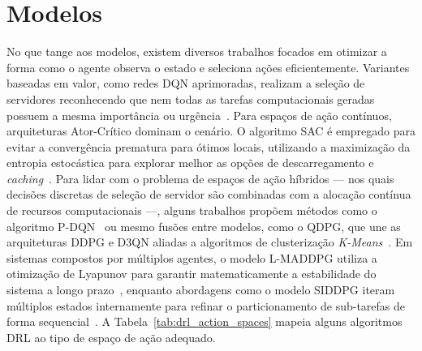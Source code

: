 \section*{Modelos}
No que tange aos modelos, existem diversos trabalhos focados em otimizar a forma como o agente observa o estado e seleciona ações eficientemente. Variantes baseadas em valor, como redes \gls{DQN} aprimoradas, realizam a seleção de servidores reconhecendo que nem todas as tarefas computacionais geradas possuem a mesma importância ou urgência~\cite{kumari2025}. Para espaços de ação contínuos, arquiteturas Ator-Crítico dominam o cenário. O algoritmo \gls{SAC} é empregado para evitar a convergência prematura para ótimos locais, utilizando a maximização da entropia estocástica para explorar melhor as opções de descarregamento e \textit{caching}~\cite{bao2025}. Para lidar com o problema de espaços de ação híbridos --- nos quais decisões discretas de seleção de servidor são combinadas com a alocação contínua de recursos computacionais ---, alguns trabalhos propõem métodos como o algoritmo \gls{P-DQN}~\cite{ma2025} ou mesmo fusões entre modelos, como o \gls{QDPG}, que une as arquiteturas \gls{DDPG} e \gls{D3QN} aliadas a algoritmos de clusterização \textit{K-Means}~\cite{wei2024}. Em sistemas compostos por múltiplos agentes, o modelo \gls{L-MADDPG} utiliza a otimização de Lyapunov para garantir matematicamente a estabilidade do sistema a longo prazo~\cite{kumar2023}, enquanto abordagens como o modelo \gls{SIDDPG} iteram múltiplos estados internamente para refinar o particionamento de sub-tarefas de forma sequencial~\cite{tian2025}. A Tabela~\ref{tab:drl_action_spaces} mapeia alguns algoritmos \gls{DRL} ao tipo de espaço de ação adequado.

